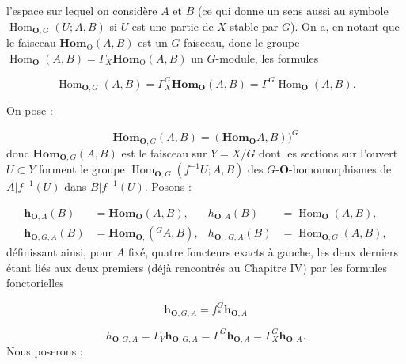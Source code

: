 \clearpage
{}

\noindent l'espace sur lequel on considère $A$ et $B$ (ce qui donne un sens
aussi au symbole $\operatorname{Hom}_{{\mathbf O},G}(U;A,B)$ si $U$ est une partie de
$X$ stable par $G$). On a, en notant que le faisceau
$\mathbf{Hom}_{\mathrm O}(A,B)$ est un $G$-faisceau, donc le groupe
$\operatorname{Hom}_{\mathbf O}(A,B)=\Gamma_X\mathbf{Hom}_{\mathrm O}(A,B)$ un $G$-module, les
formules

\[
\tag{5.6.1}
\operatorname{Hom}_{{\mathbf O},G}(A,B)
=\Gamma_X^G\mathbf{Hom}_{\mathbf O}(A,B)
=\Gamma^G\operatorname{Hom}_{\mathbf O}(A,B).
\]

On pose :

\[
\tag{5.6.2}
\mathbf{Hom}_{{\mathbf O},G}(A,B)=(\mathbf{Hom}_{\mathbf O} A,B))^G
\]
 donc $\mathbf{Hom}_{{\mathbf O},G}(A,B)$ est le faisceau sur $Y=X/G$ dont les
sections sur l'ouvert $U\subset Y$ forment le groupe
$\operatorname{Hom}_{{\mathbf O},G}(f^{-1}U;A,B)$ des $G$-${\mathbf O}$-homomorphismes de
$A|f^{-1}(U)$ dans $B|f^{-1}(U)$. Posons :

\[
\tag{5.6.3}
\begin{aligned}
\mathbf h_{{\mathbf O},A}(B)&=\mathbf{Hom}_{\mathbf O}(A,B),&
h_{{\mathbf O},A}(B)&=\operatorname{Hom}_{\mathbf O}(A,B),\\
\mathbf h_{{\mathbf O},G,A}(B)&=\mathbf{Hom}_{{\mathbf O},}({}^G\!A,B),&
h_{{\mathbf O},,G,A}(B)&=\operatorname{Hom}_{{\mathbf O},G}(A,B),
\end{aligned}
\]
 définissant ainsi, pour $A$ fixé, quatre foncteurs exacts à gauche,
les deux derniers étant liés aux deux premiers (déjà rencontrés au Chapitre
IV) par les formules fonctorielles

\[
\tag{5.6.4}
\mathbf h_{{\mathbf O},G,A}=f_*^G\mathbf h_{{\mathbf O},A}
\]

\[
\tag{5.6.5}
h_{{\mathbf O},G,A}=\Gamma_Y\mathbf h_{{\mathbf O},G,A}
=\Gamma^G\mathbf h_{{\mathbf O},A}=\Gamma_X^G\mathbf h_{{\mathbf O},A}.
\]
Nous poserons :

